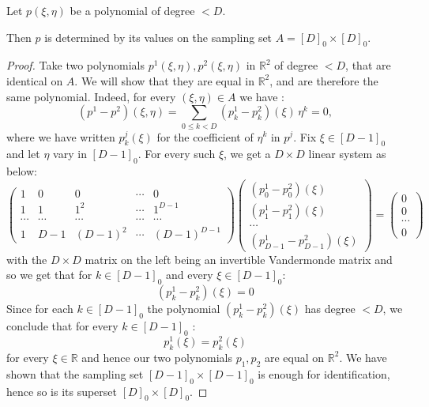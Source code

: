 \documentclass[10pt,a4paper]{amsart}
\newcommand{\RR}{{\mathbb R}}
\begin{document}
\begin{lemma}\label{bipoly}
Let $p(\xi, \eta)$ be a polynomial of degree $< D$.

Then $p$ is determined by its values on the sampling set $A = [D]_0\times[D]_0$.
\end{lemma}

\begin{proof}
Take two polynomials $p^1(\xi,\eta), p^2 (\xi,\eta)$ in $\RR^2$ of degree $< D$, that are identical on $A$. We will show that they are equal in $\RR^2$, and are therefore the same polynomial. Indeed, for every $(\xi,\eta) \in A$ we have :
\begin{equation*}
(p^1-p^2)(\xi,\eta) = \sum_{0\le k < D}( p_k^1 -p_k^2)( \xi ) \, \eta^k=0,
\end{equation*}
where we have written $p^j_k(\xi)$ for the coefficient of $\eta^k$ in $p^j$.
Fix $\xi \in [D-1]_0$ and let $\eta$ vary in $[D-1]_0$. For every such $\xi$, we get a $D\times D$ linear system as below:
\begin{equation*}
\begin{pmatrix}
1 & 0 & 0 & \cdots & 0 \\
1 & 1 & 1^2 & \cdots & 1^{D-1}\\
\cdots  & \cdots  & \cdots  & \cdots & \cdots  \\
1 & D-1 & (D-1)^2 & \cdots & (D-1)^{D-1} 
\end{pmatrix}
\begin{pmatrix}
(p_0  ^1 -p_0^2) (\xi) \\
(p_1  ^1 -p_1^2) (\xi) \\
\cdots \\
(p_{D-1}  ^1 -p_{D-1}^2) (\xi)
\end{pmatrix}
=
\begin{pmatrix}
0 \\ 0 \\ \cdots \\ 0
\end{pmatrix}
\end{equation*}
with the $D \times D$ matrix on the left being an invertible Vandermonde matrix and so we get that for $k\in [D-1]_0 $ and every $\xi\in [ D-1 ]_0$:
\begin{equation*}
(p_k ^1 -p_k ^2) (\xi) =0
\end{equation*}
 Since for each $k\in [D-1]_0 $ the polynomial $(p_k ^1 -p_k ^2) (\xi)$  has degree $< D$, we conclude that for every $k \in [D-1]_0$ :
\begin{equation*}
p_k^1 (\xi) = p_k ^2 (\xi )
\end{equation*}
for every $\xi \in \RR$ and hence our two polynomials $p_1 , p_2$ are equal on $\RR ^2$.
We have shown that the sampling set $[D-1]_0 \times [D-1]_0$ is enough for identification, hence so is its superset $[D]_0 \times [D]_0$.

\end{proof}
\end{document}
